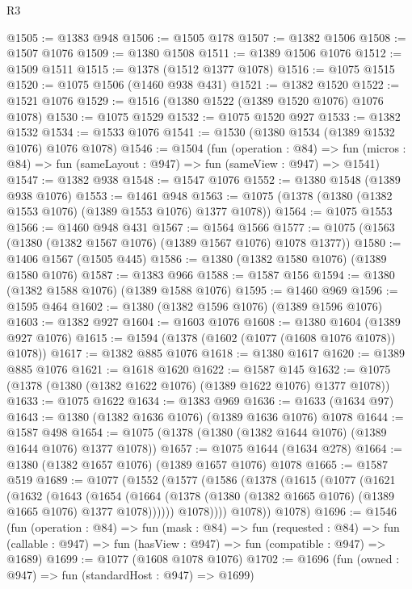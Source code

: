 \begin{lexlean}{R3}
\begin{coremodule}
@1505 := @1383 @948
@1506 := @1505 @178
@1507 := @1382 @1506
@1508 := @1507 @1076
@1509 := @1380 @1508
@1511 := @1389 @1506 @1076
@1512 := @1509 @1511
@1515 := @1378 (@1512 @1377 @1078)
@1516 := @1075 @1515
@1520 := @1075 @1506 (@1460 @938 @431)
@1521 := @1382 @1520
@1522 := @1521 @1076
@1529 := @1516 (@1380 @1522 (@1389 @1520 @1076) @1076 @1078)
@1530 := @1075 @1529
@1532 := @1075 @1520 @927
@1533 := @1382 @1532
@1534 := @1533 @1076
@1541 := @1530 (@1380 @1534 (@1389 @1532 @1076) @1076 @1078)
@1546 := @1504
    (fun (operation : @84) =>
    fun (micros : @84) => fun (sameLayout : @947) => fun (sameView : @947) => @1541)
@1547 := @1382 @938
@1548 := @1547 @1076
@1552 := @1380 @1548 (@1389 @938 @1076)
@1553 := @1461 @948
@1563 := @1075 (@1378 (@1380 (@1382 @1553 @1076) (@1389 @1553 @1076) @1377 @1078))
@1564 := @1075 @1553
@1566 := @1460 @948 @431
@1567 := @1564 @1566
@1577 := @1075 (@1563 (@1380 (@1382 @1567 @1076) (@1389 @1567 @1076) @1078 @1377))
@1580 := @1406 @1567 (@1505 @445)
@1586 := @1380 (@1382 @1580 @1076) (@1389 @1580 @1076)
@1587 := @1383 @966
@1588 := @1587 @156
@1594 := @1380 (@1382 @1588 @1076) (@1389 @1588 @1076)
@1595 := @1460 @969
@1596 := @1595 @464
@1602 := @1380 (@1382 @1596 @1076) (@1389 @1596 @1076)
@1603 := @1382 @927
@1604 := @1603 @1076
@1608 := @1380 @1604 (@1389 @927 @1076)
@1615 := @1594 (@1378 (@1602 (@1077 (@1608 @1076 @1078)) @1078))
@1617 := @1382 @885 @1076
@1618 := @1380 @1617
@1620 := @1389 @885 @1076
@1621 := @1618 @1620
@1622 := @1587 @145
@1632 := @1075 (@1378 (@1380 (@1382 @1622 @1076) (@1389 @1622 @1076) @1377 @1078))
@1633 := @1075 @1622
@1634 := @1383 @969
@1636 := @1633 (@1634 @97)
@1643 := @1380 (@1382 @1636 @1076) (@1389 @1636 @1076) @1078
@1644 := @1587 @498
@1654 := @1075 (@1378 (@1380 (@1382 @1644 @1076) (@1389 @1644 @1076) @1377 @1078))
@1657 := @1075 @1644 (@1634 @278)
@1664 := @1380 (@1382 @1657 @1076) (@1389 @1657 @1076) @1078
@1665 := @1587 @519
@1689 := @1077
    (@1552
      (@1577
        (@1586
          (@1378
            (@1615
              (@1077
                (@1621
                  (@1632
                    (@1643
                      (@1654
                        (@1664
                          (@1378 (@1380 (@1382 @1665 @1076) (@1389 @1665 @1076) @1377 @1078))))))
                  @1078))))
          @1078))
      @1078)
@1696 := @1546
    (fun (operation : @84) =>
    fun (mask : @84) =>
    fun (requested : @84) =>
    fun (callable : @947) => fun (hasView : @947) => fun (compatible : @947) => @1689)
@1699 := @1077 (@1608 @1078 @1076)
@1702 := @1696 (fun (owned : @947) => fun (standardHost : @947) => @1699)

\end{coremodule}
\end{lexlean}
